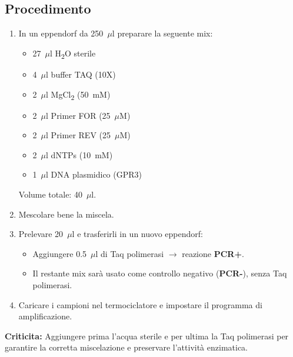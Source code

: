 \subsection{Procedimento}
\begin{enumerate}
    \item In un eppendorf da 250~$\mu$l preparare la seguente mix:
    \begin{itemize}
        \item 27~$\mu$l H\textsubscript{2}O sterile
        \item 4~$\mu$l buffer TAQ (10X)
        \item 2~$\mu$l MgCl\textsubscript{2} (50~mM)
        \item 2~$\mu$l Primer FOR (25~$\mu$M)
        \item 2~$\mu$l Primer REV (25~$\mu$M)
        \item 2~$\mu$l dNTPs (10~mM)
        \item 1~$\mu$l DNA plasmidico (GPR3)
    \end{itemize}
    Volume totale: 40~$\mu$l.
    
    \item Mescolare bene la miscela.
    
    \item Prelevare 20~$\mu$l e trasferirli in un nuovo eppendorf:
    \begin{itemize}
        \item Aggiungere 0.5~$\mu$l di Taq polimerasi $\rightarrow$ reazione \textbf{PCR+}.
        \item Il restante mix sarà usato come controllo negativo (\textbf{PCR-}), senza Taq polimerasi.
    \end{itemize}
    
    \item Caricare i campioni nel termociclatore e impostare il programma di amplificazione.
\end{enumerate}

\begin{criticitaBox}
    \textbf{Criticita:}
    Aggiungere prima l’acqua sterile e per ultima la Taq polimerasi per garantire la corretta miscelazione e preservare l’attività enzimatica.
\end{criticitaBox}



